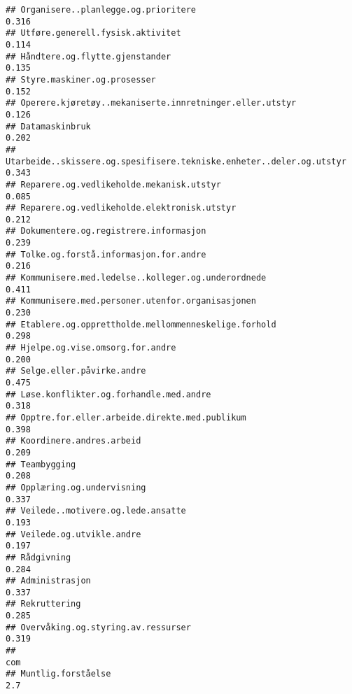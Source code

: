\documentclass[
]{article}
\begin{document}
\begin{verbatim}
## Organisere..planlegge.og.prioritere                                              0.316
## Utføre.generell.fysisk.aktivitet                                                 0.114
## Håndtere.og.flytte.gjenstander                                                   0.135
## Styre.maskiner.og.prosesser                                                      0.152
## Operere.kjøretøy..mekaniserte.innretninger.eller.utstyr                          0.126
## Datamaskinbruk                                                                   0.202
## Utarbeide..skissere.og.spesifisere.tekniske.enheter..deler.og.utstyr             0.343
## Reparere.og.vedlikeholde.mekanisk.utstyr                                         0.085
## Reparere.og.vedlikeholde.elektronisk.utstyr                                      0.212
## Dokumentere.og.registrere.informasjon                                            0.239
## Tolke.og.forstå.informasjon.for.andre                                            0.216
## Kommunisere.med.ledelse..kolleger.og.underordnede                                0.411
## Kommunisere.med.personer.utenfor.organisasjonen                                  0.230
## Etablere.og.opprettholde.mellommenneskelige.forhold                              0.298
## Hjelpe.og.vise.omsorg.for.andre                                                  0.200
## Selge.eller.påvirke.andre                                                        0.475
## Løse.konflikter.og.forhandle.med.andre                                           0.318
## Opptre.for.eller.arbeide.direkte.med.publikum                                    0.398
## Koordinere.andres.arbeid                                                         0.209
## Teambygging                                                                      0.208
## Opplæring.og.undervisning                                                        0.337
## Veilede..motivere.og.lede.ansatte                                                0.193
## Veilede.og.utvikle.andre                                                         0.197
## Rådgivning                                                                       0.284
## Administrasjon                                                                   0.337
## Rekruttering                                                                     0.285
## Overvåking.og.styring.av.ressurser                                               0.319
##                                                                                  com
## Muntlig.forståelse                                                               2.7

\end{verbatim}
\end{document}
